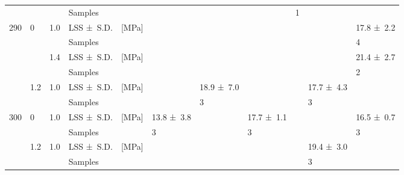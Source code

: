 \begin{table}[htb]
{\begin{tabular}{@{}lll L{1.6cm} l C{1.1cm} C{1.1cm} C{1.1cm} C{1.1cm} C{1.1cm} C{1.1cm}@{}}
			                   &          &           & Samples           &           &                   &                   &                   & 1                &                   &                   \\
			290                & 0        & 1.0       & LSS \mbox{± S.D.} & {[}MPa{]} &                   &                   &                   &                  &                   & 17.8 \mbox{± 2.2} \\
			                   &          &           & Samples           &           &                   &                   &                   &                  &                   & 4                 \\
			                   &          & 1.4       & LSS \mbox{± S.D.} & {[}MPa{]} &                   &                   &                   &                  &                   & 21.4 \mbox{± 2.7} \\
			                   &          &           & Samples           &           &                   &                   &                   &                  &                   & 2                 \\
			                   & 1.2      & 1.0       & LSS \mbox{± S.D.} & {[}MPa{]} &                   & 18.9 \mbox{± 7.0} &                   &                  & 17.7 \mbox{± 4.3} &                   \\
			                   &          &           & Samples           &           &                   & 3                 &                   &                  & 3                 &                   \\
			300                & 0        & 1.0       & LSS \mbox{± S.D.} & {[}MPa{]} & 13.8 \mbox{± 3.8} &                   & 17.7 \mbox{± 1.1} &                  &                   & 16.5 \mbox{± 0.7} \\
			                   &          &           & Samples           &           & 3                 &                   & 3                 &                  &                   & 3                 \\
			                   & 1.2      & 1.0       & LSS \mbox{± S.D.} & {[}MPa{]} &                   &                   &                   &                  & 19.4 \mbox{± 3.0} &                   \\
			                   &          &           & Samples           &           &                   &                   &                   &                  & 3                 &                   \\ \bottomrule
		\end{tabular}}
	\label{tab:T2_table4}
\end{table}

